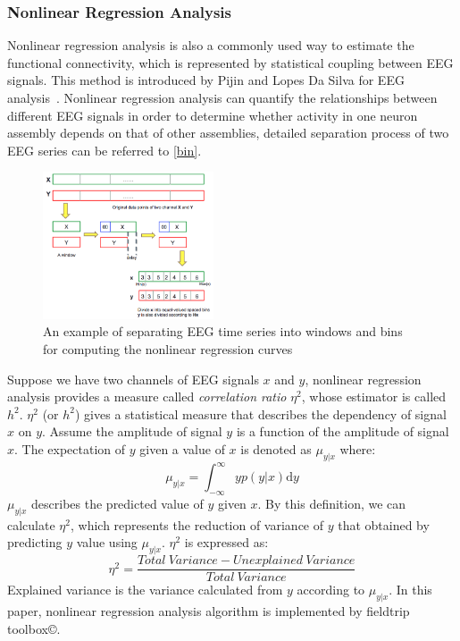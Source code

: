 \subsubsection{Nonlinear Regression Analysis}
Nonlinear regression analysis is also a commonly used way to estimate the functional connectivity, which is represented by statistical coupling between EEG signals. This method is introduced by Pijin and Lopes Da Silva for EEG analysis~\cite{pijn1990localization}. Nonlinear regression analysis can quantify the relationships between different EEG signals in order to determine whether activity in one neuron assembly depends on that of other assemblies, detailed separation process of two EEG series can be referred to \ref{bin}.
\begin{figure}[!t]
    \centering
    \includegraphics[width=0.45\textwidth]{./images/binsepa.png}
    \caption{An example of separating EEG time series into windows and bins for computing the nonlinear regression curves}
    \label{fig:bin}
\end{figure}
Suppose we have two channels of EEG signals $x$ and $y$, nonlinear regression analysis provides a measure called \emph{correlation ratio} $\eta^2$, whose estimator is called $h^2$. $\eta^2$ (or $h^2$) gives a statistical measure that describes the dependency of signal $x$ on $y$. Assume the amplitude of signal $y$ is a function of the amplitude of signal $x$. The expectation of $y$ given a value of $x$ is denoted as $\mu_{y|x}$ where:
\begin{equation} \label{eq:regressioncurve}
\mu_{y|x} = \int_{-\infty}^{\infty} y p(y|x) \mathrm{d}y
\end{equation}
$\mu_{y|x}$ describes the predicted value of $y$ given $x$. By this definition, we can calculate $\eta^2$, which represents the reduction of variance of $y$ that obtained by predicting $y$ value using $\mu_{y|x}$. $\eta^2$ is expressed as:
\begin{equation} \label{eq:NRAregression}
\eta^2 = \frac{Total \ Variance - Unexplained \ Variance}{Total \ Variance}
\end{equation}
Explained variance is the variance calculated from $y$ according to $\mu_{y|x}$. In this paper, nonlinear regression analysis algorithm is implemented by fieldtrip toolbox\copyright.

